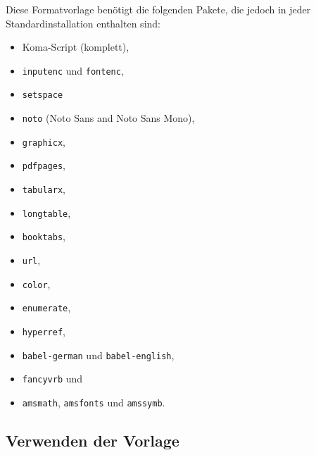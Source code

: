 \documentclass[plainarticle,zihtitle,german,final,hyperref,utf8,wrapper]{zihpub}
\begin{document}
Diese Formatvorlage ben\"otigt die folgenden Pakete, die jedoch in jeder Standardinstallation enthalten sind:
\begin{itemize}
	\item  Koma-Script (komplett),
	\item \texttt{inputenc} und \texttt{fontenc},
	\item \texttt{setspace}
  \item \texttt{noto} (Noto Sans and Noto Sans Mono),
	\item \texttt{graphicx},
  \item \texttt{pdfpages},
	\item \texttt{tabularx},
	\item \texttt{longtable},
	\item \texttt{booktabs},
	\item \texttt{url},
	\item \texttt{color},
	\item \texttt{enumerate},
	\item \texttt{hyperref},
    	\item \texttt{babel-german} und \texttt{babel-english},
	\item \texttt{fancyvrb} und
	\item \texttt{amsmath}, \texttt{amsfonts} und \texttt{amssymb}.
\end{itemize}

\subsection{Verwenden der Vorlage}
\end{document}
